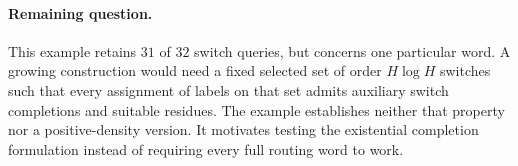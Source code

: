 \documentclass[11pt]{article}
\begin{document}
\paragraph{Remaining question.}
This example retains $31$ of $32$ switch queries, but concerns one
particular word. A growing construction would need a fixed selected
set of order $H\log H$ switches such that every assignment of labels
on that set admits auxiliary switch completions and suitable residues.
The example establishes neither that property nor a positive-density
version. It motivates testing the existential completion formulation
instead of requiring every full routing word to work.
\end{document}
